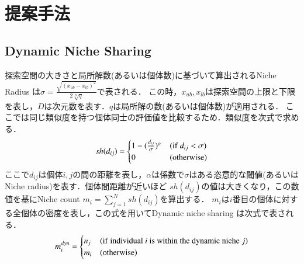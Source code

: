 \documentclass[twocolumn, a4paper]{UECIEresume}
\begin{document}
\section{提案手法}
\subsection{Dynamic Niche Sharing}
\label{ss:dns}
探索空間の大きさと局所解数(あるいは個体数)に基づいて算出されるNiche Radius \cite{niche} は$\sigma=\frac{\sqrt{(x_{ub}-x_{lb})^2}}{2 \sqrt[D]{q}}$で表される．
この時，$x_{ub},x_{lb}$は探索空間の上限と下限を表し，$D$は次元数を表す．$q$は局所解の数(あるいは個体数)が適用される．
ここでは同じ類似度を持つ個体同士の評価値を比較するため．類似度を次式で求める．
\begin{equation}
\label{eq:sfunc}
sh(d_{ij})= \begin{cases}
1-(\frac{d_{ij}}{\sigma})^\alpha & ({\rm if} \ d_{ij} < \sigma)\\
0 & ({\rm otherwise})
\end{cases}
\end{equation}
ここで$d_{ij}$は個体$i,j$の間の距離を表し，$\alpha$は係数で$\sigma$はある恣意的な閾値(あるいはNiche radius)を表す．個体間距離が近いほど $sh(d_{ij})$の値は大きくなり，この数値を基にNiche count $m_i=\sum_{j=1}^N sh(d_{ij})$を算出する．
$m_i$は$i$番目の個体に対する全個体の密度を表し，この式を用いてDynamic niche sharing \cite{DNS} は次式で表される．
\begin{equation}
\label{eq:dns}
m_i^{dyn}=\begin{cases}
n_j & ({\rm if \ individual}\ i {\rm \ is \ within \ the \ dynamic \ niche }\ j) \\
m_i & ({\rm otherwise})
\end{cases}
\end{equation}
\end{document}
